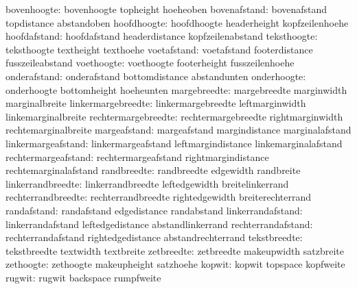                   bovenhoogte:  bovenhoogte                  topheight
                                hoeheoben
                 bovenafstand:  bovenafstand                 topdistance
                                abstandoben
                  hoofdhoogte:  hoofdhoogte                  headerheight
                                kopfzeilenhoehe
                 hoofdafstand:  hoofdafstand                 headerdistance
                                kopfzeilenabstand
                  teksthoogte:  teksthoogte                  textheight
                                texthoehe
                  voetafstand:  voetafstand                  footerdistance
                                fusszeileabstand
                   voethoogte:  voethoogte                   footerheight
                                fusszeilenhoehe
                 onderafstand:  onderafstand                 bottomdistance
                                abstandunten
                  onderhoogte:  onderhoogte                  bottomheight
                                hoeheunten
                 margebreedte:  margebreedte                 marginwidth
                                marginalbreite
           linkermargebreedte:  linkermargebreedte           leftmarginwidth
                                linkemarginalbreite
          rechtermargebreedte:  rechtermargebreedte          rightmarginwidth
                                rechtemarginalbreite
                 margeafstand:  margeafstand                 margindistance
                                marginalafstand
           linkermargeafstand:  linkermargeafstand           leftmargindistance
                                linkemarginalafstand
          rechtermargeafstand:  rechtermargeafstand          rightmargindistance
                                rechtemarginalafstand
                  randbreedte:  randbreedte                  edgewidth
                                randbreite
            linkerrandbreedte:  linkerrandbreedte            leftedgewidth
                                breitelinkerrand
           rechterrandbreedte:  rechterrandbreedte           rightedgewidth
                                breiterechterrand
                  randafstand:  randafstand                  edgedistance
                                randabstand
            linkerrandafstand:  linkerrandafstand            leftedgedistance
                                abstandlinkerrand
           rechterrandafstand:  rechterrandafstand           rightedgedistance
                                abstandrechterrand
                 tekstbreedte:  tekstbreedte                 textwidth
                                textbreite
                   zetbreedte:  zetbreedte                   makeupwidth
                                satzbreite
                    zethoogte:  zethoogte                    makeupheight
                                satzhoehe
                       kopwit:  kopwit                       topspace
                                kopfweite
                       rugwit:  rugwit                       backspace
                                rumpfweite

